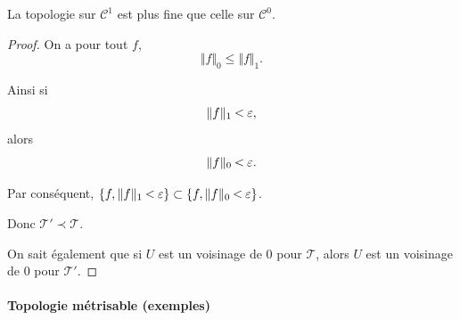 \documentclass[french]{book}
\newcommand{\lesss}{\rotatebox[origin=c]{90}{$\land$}}
\newcommand{\less}{\ \lesss\ }
\begin{document}
La topologie sur $\mathcal{C}^1$ est plus fine que celle sur $\mathcal{C}^0$.

\begin{proof}
  On a pour tout $f$, $$\Vert f \Vert _{0} \leq \Vert f \Vert _{1} .$$

  Ainsi si $$\Vert f \Vert _{1} \less \varepsilon,   $$ alors $$\Vert f \Vert _{0} \less \varepsilon.  $$

  Par conséquent, $\{ f , \Vert f \Vert _{1 } \less \varepsilon  \} \subset \{ f, \Vert f \Vert _{0} \less \varepsilon   \} $.

  Donc $\mathscr{T}' \prec \mathscr{T}  $.

  On sait également que si $U$ est un voisinage de 0 pour $\mathscr{T} $, alors $U$ est un voisinage de 0 pour $\mathscr{T}' $.
\end{proof}

\paragraph{Topologie métrisable (exemples)}
\end{document}
